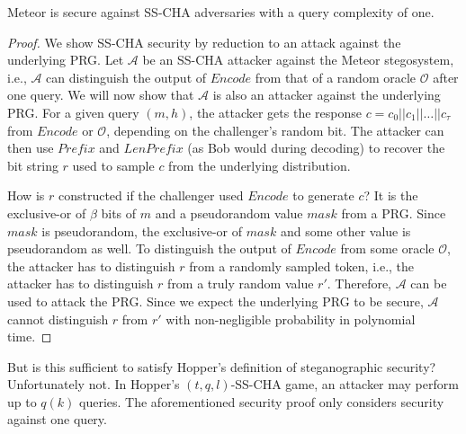 \begin{theorem}
  Meteor is secure against SS-CHA adversaries with a query complexity of one.
\label{thm:meteor-secure}
\end{theorem}
\begin{proof}
  We show SS-CHA security by reduction to an attack against the underlying PRG.
  Let $\mathcal{A}$ be an SS-CHA attacker against the Meteor stegosystem, i.e., $\mathcal{A}$ can distinguish the output of $Encode$ from that of a random oracle $\mathcal{O}$ after one query.
  We will now show that $\mathcal{A}$ is also an attacker against the underlying PRG.
  For a given query $(m,h)$, the attacker gets the response $c = c_0 ||c_1 || \dots || c_{\tau}$ from $Encode$ or $\mathcal{O}$, depending on the challenger's random bit.
  The attacker can then use $Prefix$ and $LenPrefix$ (as Bob would during decoding) to recover the bit string $r$ used to sample $c$ from the underlying distribution.

  How is $r$ constructed if the challenger used $Encode$ to generate $c$?
  It is the exclusive-or of $\beta$ bits of $m$ and a pseudorandom value $mask$ from a PRG.
  Since $mask$ is pseudorandom, the exclusive-or of $mask$ and some other value is pseudorandom as well.
  To distinguish the output of $Encode$ from some oracle $\mathcal{O}$, the attacker has to distinguish $r$ from a randomly sampled token, i.e., the attacker has to distinguish $r$ from a truly random value $r'$.
  Therefore, $\mathcal{A}$ can be used to attack the PRG.
  Since we expect the underlying PRG to be secure, $\mathcal{A}$ cannot distinguish $r$ from $r'$ with non-negligible probability in polynomial time.
\end{proof}

But is this sufficient to satisfy Hopper's definition of steganographic security?
Unfortunately not.
In Hopper's $(t,q,l)$-SS-CHA game, an attacker may perform up to $q(k)$ queries.
The aforementioned security proof only considers security against one query.

